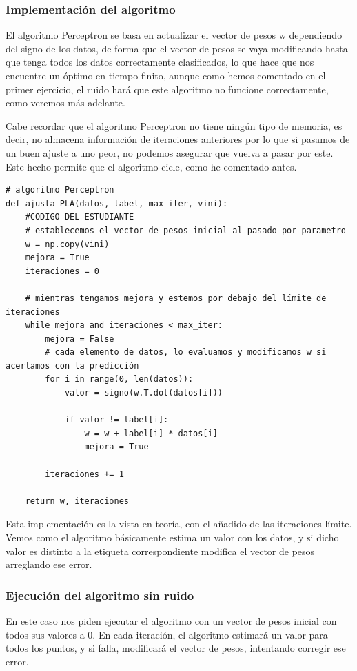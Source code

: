 \documentclass[12pt, spanish]{article}
\begin{document}
\subsubsection{Implementación del algoritmo}

El algoritmo Perceptron se basa en actualizar el vector de pesos w dependiendo del signo de los datos, de forma que el vector de pesos se vaya modificando hasta que tenga todos los datos correctamente clasificados, lo que hace que nos encuentre un óptimo en tiempo finito, aunque como hemos comentado en el primer ejercicio, el ruido hará que este algoritmo no funcione correctamente, como veremos más adelante.

Cabe recordar que el algoritmo Perceptron no tiene ningún tipo de memoria, es decir, no almacena información de iteraciones anteriores por lo que si pasamos de un buen ajuste a uno peor, no podemos asegurar que vuelva a pasar por este. Este hecho permite que el algoritmo cicle, como he comentado antes.

\begin{lstlisting}
# algoritmo Perceptron
def ajusta_PLA(datos, label, max_iter, vini):
    #CODIGO DEL ESTUDIANTE
    # establecemos el vector de pesos inicial al pasado por parametro
	w = np.copy(vini)
	mejora = True
	iteraciones = 0

	# mientras tengamos mejora y estemos por debajo del límite de iteraciones
	while mejora and iteraciones < max_iter:
		mejora = False
		# cada elemento de datos, lo evaluamos y modificamos w si acertamos con la predicción
		for i in range(0, len(datos)):
			valor = signo(w.T.dot(datos[i]))

			if valor != label[i]:
				w = w + label[i] * datos[i]
				mejora = True

		iteraciones += 1

	return w, iteraciones

\end{lstlisting}

Esta implementación es la vista en teoría, con el añadido de las iteraciones límite. Vemos como el algoritmo básicamente estima un valor con los datos, y si dicho valor es distinto a la etiqueta correspondiente modifica el vector de pesos arreglando ese error.

\subsubsection{Ejecución del algoritmo sin ruido}

En este caso nos piden ejecutar el algoritmo con un vector de pesos inicial con todos sus valores a 0. En cada iteración, el algoritmo estimará un valor para todos los puntos, y si falla, modificará el vector de pesos, intentando corregir ese error.
\end{document}
